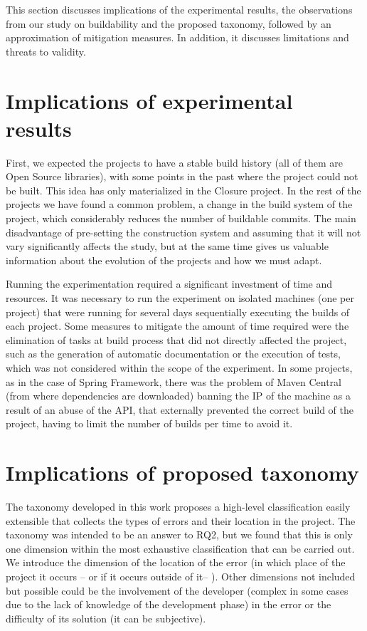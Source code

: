 This section discusses implications of the experimental results, the observations from our study on buildability and the proposed taxonomy, followed by an approximation of mitigation measures. In addition, it discusses limitations and threats to validity.

\section{Implications of experimental results}

First, we expected the projects to have a stable build history (all of them are Open Source libraries), with some points in the past where the project could not be built. This idea has only materialized in the Closure project. In the rest of the projects we have found a common problem, a change in the build system of the project, which considerably reduces the number of buildable commits. The main disadvantage of pre-setting the construction system and assuming that it will not vary significantly affects the study, but at the same time gives us valuable information about the evolution of the projects and how we must adapt.

Running the experimentation required a significant investment of time and resources. It was necessary to run the experiment on isolated machines (one per project) that were running for several days sequentially executing the builds of each project. Some measures to mitigate the amount of time required were the elimination of tasks at build process that did not directly affected the project, such as the generation of automatic documentation or the execution of tests, which was not considered within the scope of the experiment. In some projects, as in the case of Spring Framework, there was the problem of Maven Central (from where dependencies are downloaded) banning the IP of the machine as a result of an abuse of the API, that externally prevented the correct build of the project, having to limit the number of builds per time to avoid it.

\section{Implications of proposed taxonomy}

The taxonomy developed in this work proposes a high-level classification easily extensible that collects the types of errors and their location in the project. The taxonomy was intended to be an answer to RQ2, but we found that this is only one dimension within the most exhaustive classification that can be carried out. We introduce the dimension of the location of the error (in which place of the project it occurs -- or if it occurs outside of it-- ). Other dimensions not included but possible could be the involvement of the developer (complex in some cases due to the lack of knowledge of the development phase) in the error or the difficulty of its solution (it can be subjective).

